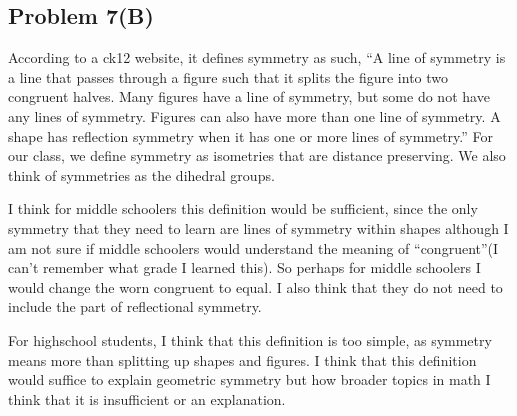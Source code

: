 \documentclass[12pt]{article}
\begin{document}
\subsection*{Problem 7(B)}
According to a ck12 website, it defines symmetry as such, “A line of symmetry is a line that passes through a figure such that it splits the figure into two congruent halves. Many figures have a line of symmetry, but some do not have any lines of symmetry. Figures can also have more than one line of symmetry. A shape has reflection symmetry when it has one or more lines of symmetry.” For our class, we define symmetry as isometries that are distance preserving. We also think of symmetries as the dihedral groups.

I think for middle schoolers this definition would be sufficient, since the only symmetry that they need to learn are lines of symmetry within shapes although I am not sure if middle schoolers would understand the meaning of “congruent”(I can’t remember what grade I learned this). So perhaps for middle schoolers I would change the worn congruent to equal. I also think that they do not need to include the part of reflectional symmetry.

For highschool students, I think that this definition is too simple, as symmetry means more than splitting up shapes and figures. I think that this definition would suffice to explain geometric symmetry but how broader topics in math I think that it is insufficient or an explanation.
\end{document}
